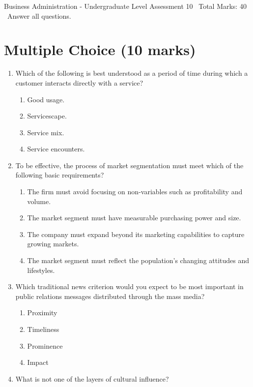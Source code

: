 \documentclass[12pt]{article}
\begin{document}
\begin{center}
Business Administration - Undergraduate Level Assessment 10 \
Total Marks: 40 \
Answer all questions.
\end{center}

\section*{Multiple Choice (10 marks)}
\begin{enumerate}[label=\arabic*.]
\item Which of the following is best understood as a period of time during which a customer interacts directly with a service?
\begin{enumerate}[label=(\alph*)]
    \item Good usage.
    \item Servicescape.
    \item Service mix.
    \item Service encounters.
\end{enumerate}
\item To be effective, the process of market segmentation must meet which of the following basic requirements?
\begin{enumerate}[label=(\alph*)]
    \item The firm must avoid focusing on non-variables such as profitability and volume.
    \item The market segment must have measurable purchasing power and size.
    \item The company must expand beyond its marketing capabilities to capture growing markets.
    \item The market segment must reflect the population's changing attitudes and lifestyles.
\end{enumerate}
\item Which traditional news criterion would you expect to be most important in public relations messages distributed through the mass media?
\begin{enumerate}[label=(\alph*)]
    \item Proximity
    \item Timeliness
    \item Prominence
    \item Impact
\end{enumerate}
\item What is not one of the layers of cultural influence?
\begin{enumerate}[label=(\alph*)]

\end{enumerate}
\end{enumerate}
\end{document}

